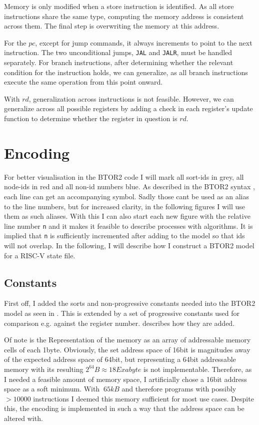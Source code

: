 Memory is only modified when a store instruction is identified. As
all store instructions share the same type, computing the memory
address is consistent across them. The final step is overwriting the
memory at this address.

For the $pc$, except for jump commands, it always increments to point
to the next instruction. The two unconditional jumps, \texttt{JAL}
and \texttt{JALR}, must be handled separately. For branch
instructions, after determining whether the relevant condition for
the instruction holds, we can generalize, as all branch instructions
execute the same operation from this point onward.

With $rd$, generalization across instructions is not feasible.
However, we can generalize across all possible registers by adding a
check in each register's update function to determine whether the
register in question is $rd$.

\section{Encoding}
For better visualisation in the BTOR2 code I will mark all sort-ids
in \textcolor{UniGrey}{grey}, all node-ids in \textcolor{UniRed}{red}
and all non-id numbers \textcolor{UniBlue}{blue}. As described in the
BTOR2 syntax \cite[Figure 1]{btor2}, each line can get an
accompanying symbol. Sadly those cant be used as an alias to the line
numbers, but for increased clarity, in the following figures I will
use them as such aliases. With this I can also start each new figure
with the relative line number \texttt{n} and it makes it feasible to
describe processes with algorithms. It is implied that \texttt{n} is
sufficiently incremented after adding to the model so that ids will
not overlap. In the following, I will describe how I construct a
BTOR2 model for a RISC-V state file.

\subsection{Constants}
First off, I added the sorts and non-progressive constants needed
into the BTOR2 model as seen in . This is
extended by a set of progressive constants used for comparison e.g.
against the register number. 
describes how they are added.

Of note is the Representation of the memory as an array of
addressable memory cells of each 1byte. Obviously, the set address
space of 16bit is magnitudes away of the expected address space of
64bit, but representing a 64bit addressable memory with its resulting
$2^{64}B \approx 18 Exabyte$ is not implementable. Therefore, as I
needed a feasible amount of memory space, I artificially chose a
16bit address space as a soft minimum. With $~65kB$ and therefore
programs with possibly $>10000$ instructions I deemed this memory
sufficient for most use cases. Despite this, the encoding is
implemented in such a way that the address space can be altered with.

